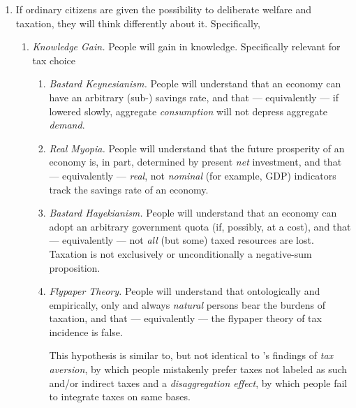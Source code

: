 \begin{enumerate}
    \item \label{itm:think-different}
		If ordinary citizens are given the possibility to deliberate welfare and taxation, they will think differently about it.
		Specifically,
		\begin{enumerate}
		
			\item \label{itm:knowledge-gain}
				\emph{Knowledge Gain.}
				People will gain in knowledge.
				Specifically relevant for tax choice %
				\begin{enumerate}
				
					\item \label{itm:bastard-keynesianism} 
						\emph{Bastard Keynesianism.}
						People will understand that an economy can have an arbitrary (sub-\citeauthor{Solow1956}) savings rate, and that --- equivalently --- if lowered slowly, aggregate \emph{consumption} will not depress aggregate \emph{demand}.
				
					\item \label{itm:real-myopia}
						\emph{Real Myopia.} %
						People will understand that the future prosperity of an economy is, in part, determined by present \emph{net} investment, and that --- equivalently --- \emph{real}, not \emph{nominal} (for example, \gls{GDP}) indicators track the savings rate of an economy.
				
					\item \label{itm:bastard-hayekianism} %
						\emph{Bastard Hayekianism.} %
						People will understand that an economy can adopt an arbitrary government quota (if, possibly, at a cost), and that --- equivalently --- not \emph{all} (but some) taxed resources are lost.
						Taxation is not exclusively or unconditionally a negative-sum proposition.
				
					\item \label{itm:flyper-theory} %
						\emph{Flypaper Theory.}
						People will understand that ontologically and empirically, only and always \emph{natural} persons bear the burdens of taxation, and that --- equivalently --- the flypaper theory of tax incidence is false.
						
						This hypothesis is similar to, but not identical to \citeauthor{McCafferyBaron2003}'s findings of \emph{tax aversion}, by which people mistakenly prefer taxes not labeled as such and/or indirect taxes and a \emph{disaggregation effect}, by which people fail to integrate taxes on same bases.
				

\end{enumerate}
\end{enumerate}
\end{enumerate}
